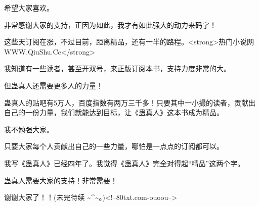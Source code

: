 \begin{this_body}
希望大家喜欢。

非常感谢大家的支持，正因为如此，我才有如此强大的动力来码字！

这些天订阅在涨，不过目前，距离精品，还有一半的路程。<strong>热门小说网WWW.QiuShu.Cc</strong>

我知道有一些读者，甚至开双号，来正版订阅本书，支持力度非常的大。

但蛊真人还需要更多人的力量！

蛊真人的贴吧有5万人，百度指数有两万三千多！只要其中一小撮的读者，贡献出自己的一份力量，我们就能达到目标，让《蛊真人》这本书成为精品。

我不勉强大家。

只要大家每个人贡献出自己的一些力量，哪怕是一点点的订阅都可以。

我写《蛊真人》已经四年了。我觉得《蛊真人》完全对得起“精品”这两个字。

蛊真人需要大家的支持！非常需要！

谢谢大家了！！(未完待续 \~{}\^{}\~{}。)<!--80txt.com-ouoou-->

\end{this_body}

